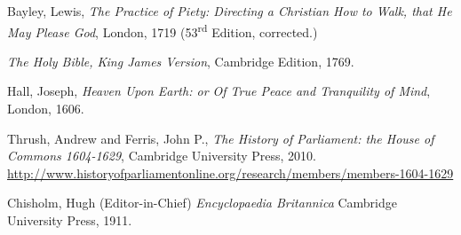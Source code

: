 \begin{thebibliography}{9}
        Bayley, Lewis,
        \textit{The Practice of Piety: Directing a Christian How to Walk, that He May Please God},
        London,
        1719 (53\textsuperscript{rd} Edition, corrected.)

        \textit{The Holy Bible, King James Version},
        Cambridge Edition,
        1769.

        Hall, Joseph,
        \textit{Heaven Upon Earth: or Of True Peace and Tranquility of Mind},
        London,
        1606.

        Thrush, Andrew and Ferris, John P.,
        \textit{The History of Parliament: the House of Commons 1604-1629},
        Cambridge University Press,
        2010.
        \url{http://www.historyofparliamentonline.org/research/members/members-1604-1629}

        Chisholm, Hugh (Editor-in-Chief)
        \textit{Encyclopaedia Britannica}
        Cambridge University Press,
        1911.
        
\end{thebibliography}